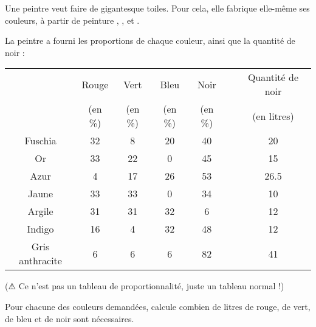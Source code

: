 \documentclass[a4paper,11pt]{article}
\begin{document}
\begin{attention}[frametitle={Exercice 2}]
	Une peintre veut faire de gigantesque toiles. Pour cela, elle fabrique elle-même ses couleurs, à partir de peinture , ,  et .

	La peintre a fourni les proportions de chaque couleur, ainsi que la quantité de noir : \vspace{1em}

	\renewcommand{\arraystretch}{1.2}
	\begin{tabular}{|c|c|c|c|c|c|c|}
		\hline
		                & Rouge   & Vert    & Bleu    & Noir    &  & Quantité de noir \\
		                & (en \%) & (en \%) & (en \%) & (en \%) &  & (en litres)      \\ \hline
		Fuschia         & 32      & 8       & 20      & 40      &  & 20               \\ \hline
		Or              & 33      & 22      & 0       & 45      &  & 15               \\ \hline
		Azur            & 4       & 17      & 26      & 53      &  & 26.5             \\ \hline
		Jaune           & 33      & 33      & 0       & 34      &  & 10               \\ \hline
		Argile          & 31      & 31      & 32      & 6       &  & 12               \\ \hline
		Indigo          & 16      & 4       & 32      & 48      &  & 12               \\ \hline
		Gris anthracite & 6       & 6       & 6       & 82      &  & 41               \\ \hline
	\end{tabular}
	\renewcommand{\arraystretch}{1}

	\begin{center}
		(⚠ Ce n'est pas un tableau de proportionnalité, juste un tableau normal !)
	\end{center}
	\vspace{0.5em}

	Pour chacune des couleurs demandées, calcule combien de litres de rouge, de vert, de bleu et de noir sont nécessaires.
\end{attention}
\end{document}
